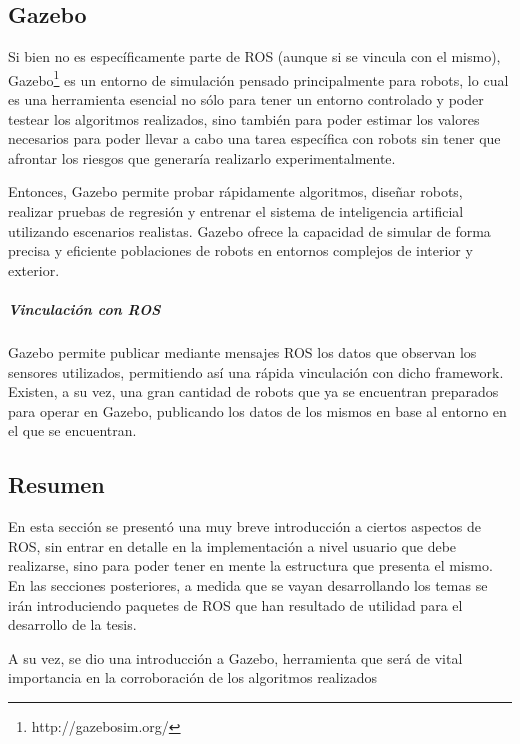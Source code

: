 \subsection{Gazebo}
Si bien no es específicamente parte de ROS (aunque si se vincula con el mismo), Gazebo\footnote{http://gazebosim.org/} es un entorno de simulación pensado principalmente para robots, lo cual es una herramienta esencial no sólo para tener un entorno controlado y poder testear los algoritmos realizados, sino también para poder estimar los valores necesarios para poder llevar a cabo una tarea específica con robots sin tener que afrontar los riesgos que generaría realizarlo experimentalmente. 

Entonces, Gazebo permite probar rápidamente algoritmos, diseñar robots, realizar pruebas de regresión y entrenar el sistema de inteligencia artificial utilizando escenarios realistas. Gazebo ofrece la capacidad de simular de forma precisa y eficiente poblaciones de robots en entornos complejos de interior y exterior. 

\subparagraph{Vinculación con ROS}
Gazebo permite publicar mediante mensajes ROS los datos que observan los sensores utilizados, permitiendo así una rápida vinculación con dicho framework. Existen, a su vez, una gran cantidad de robots que ya se encuentran preparados para operar en Gazebo, publicando los datos de los mismos en base al entorno en el que se encuentran.

\subsection{Resumen}
En esta sección se presentó una muy breve introducción a ciertos aspectos de ROS, sin entrar en detalle en la implementación a nivel usuario que debe realizarse, sino para poder tener en mente la estructura que presenta el mismo. En las secciones posteriores, a medida que se vayan desarrollando los temas se irán introduciendo paquetes de ROS que han resultado de utilidad para el desarrollo de la tesis.

A su vez, se dio una introducción a Gazebo, herramienta que será de vital importancia en la corroboración de los algoritmos realizados